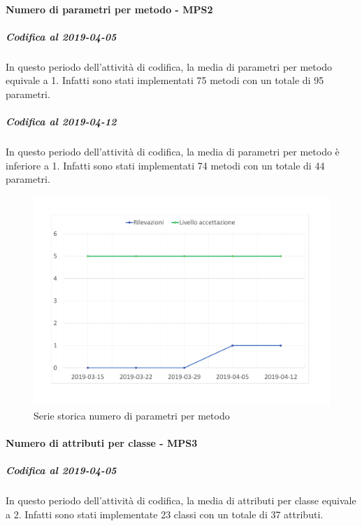 \paragraph{Numero di parametri per metodo - MPS2}
\subparagraph{Codifica al 2019-04-05}
In questo periodo dell'attività di codifica, la media di parametri per metodo equivale a 1. Infatti sono stati implementati 75 metodi con un totale di 95 parametri.

\subparagraph{Codifica al 2019-04-12}
In questo periodo dell'attività di codifica, la media di parametri per metodo è inferiore a 1. Infatti sono stati implementati 74 metodi con un totale di 44 parametri.
\begin{figure}[H]
	\centering
	\includegraphics[scale=0.6]{images/resoconto/MPS2Chart.pdf}
	\caption{Serie storica numero di parametri per metodo}	
\end{figure}

\paragraph{Numero di attributi per classe - MPS3}
\subparagraph{Codifica al 2019-04-05}
In questo periodo dell'attività di codifica, la media di attributi per classe equivale a 2. Infatti sono stati implementate 23 classi con un totale di 37 attributi.

